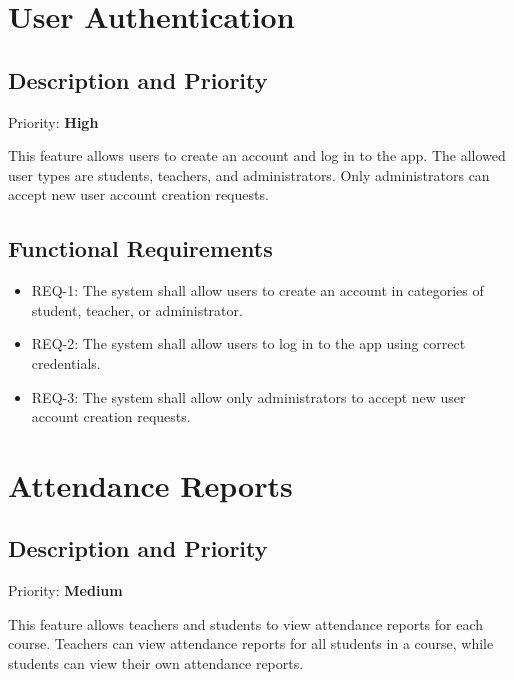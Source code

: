 \documentclass{scrreprt}
\begin{document}


\section{User Authentication}
\subsection{Description and Priority}
Priority: \textbf{High}

This feature allows users to create an account and log in to the app. The allowed user types are students, teachers, and administrators. 
Only administrators can accept new user account creation requests.

\subsection{Functional Requirements}
\begin{itemize}
    \item REQ-1: The system shall allow users to create an account in categories of student, teacher, or administrator.
    \item REQ-2: The system shall allow users to log in to the app using correct credentials.
    \item REQ-3: The system shall allow only administrators to accept new user account creation requests.
\end{itemize}


\section{Attendance Reports}
\subsection{Description and Priority}
Priority: \textbf{Medium}

This feature allows teachers and students to view attendance reports for each course. Teachers can view attendance reports for all students in a course, while students can view their own attendance reports.
\end{document}
